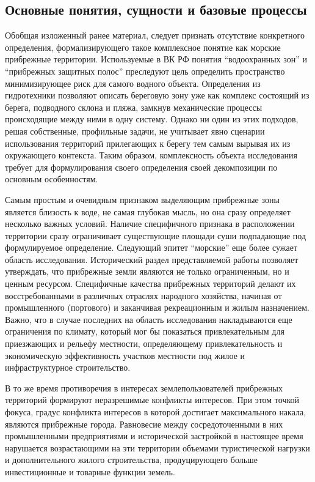 \subsection{Основные понятия, сущности и базовые процессы}

Обобщая изложенный ранее материал, следует признать отсутствие конкретного определения, формализирующего такое комплексное понятие как морские прибрежные территории.
Используемые в ВК РФ понятия \enquote{водоохранных зон} и \enquote{прибрежных защитных полос} преследуют цель определить пространство минимизирующее риск для самого водного объекта.
Определения из гидротехники позволяют описать береговую зону уже как комплекс состоящий из берега, подводного склона и пляжа, замкнув механические процессы происходящие между ними в одну систему.
Однако ни один из этих подходов, решая собственные, профильные задачи, не учитывает явно сценарии использования территорий прилегающих к берегу тем самым вырывая их из окружающего контекста.
Таким образом, комплексность объекта исследования требует для формулирования своего определения своей декомпозиции по основным особенностям.

Самым простым и очевидным признаком выделяющим прибрежные зоны является близость к воде, не самая глубокая мысль, но она сразу определяет несколько важных условий.
Наличие специфичного признака в расположении территории сразу ограничивает существующие площади суши подпадающие под формулируемое определение.
Следующий эпитет \enquote{морские} еще более сужает область исследования.
Исторический раздел представляемой работы позволяет утверждать, что прибрежные земли являются не только ограниченным, но и ценным ресурсом.
Специфичные качества прибрежных территорий делают их восстребованными в различных отраслях народного хозяйства, начиная от промышленного (портового) и заканчивая рекреационным и жилым назначением.
Важно, что в случае последних на область исследования накладываются еще ограничения по климату, который мог бы показаться привлекательным для приезжающих и рельефу местности, определяющему привлекательность и экономическую эффективность участков местности под жилое и инфраструктурное строительство.

В то же время противоречия в интересах землепользователей прибрежных территорий формируют неразрешимые конфликты интересов. 
При этом точкой фокуса, градус конфликта интересов в которой достигает максимального накала, являются прибрежные города.
Равновесие между сосредоточенными в них промышленными предприятиями и исторической застройкой в настоящее время нарушается возрастающими на эти территории объемами туристической нагрузки и дополнительного жилого строительства, продуцирующего больше инвестиционные и товарные функции земель.

